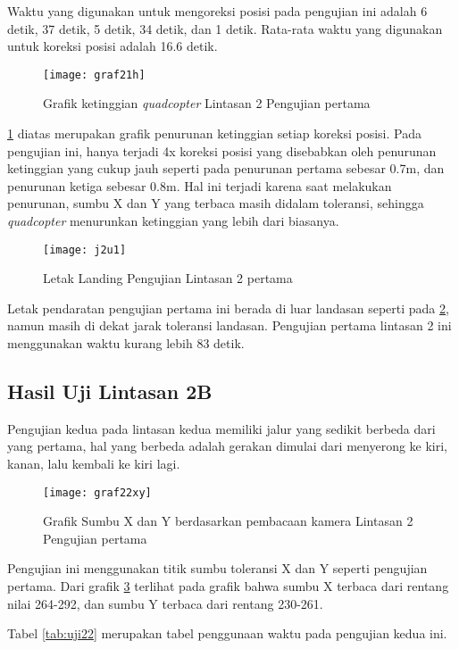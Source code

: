 Waktu yang digunakan untuk mengoreksi posisi pada pengujian ini adalah 6 detik, 37 detik, 5 detik, 34 detik, dan 1 detik. Rata-rata waktu yang digunakan untuk koreksi posisi adalah 16.6 detik.

\begin{figure}[H]
	\centering
	\texttt{[image: graf21h]}
	\caption{Grafik ketinggian \textit{quadcopter} Lintasan 2 Pengujian pertama}
	\label{fig:graf21h}
\end{figure}

\cref{fig:graf21h} diatas merupakan grafik penurunan ketinggian setiap koreksi posisi. Pada pengujian ini, hanya terjadi 4x koreksi posisi yang disebabkan oleh penurunan ketinggian yang cukup jauh seperti pada penurunan pertama sebesar 0.7m, dan penurunan ketiga sebesar 0.8m. Hal ini terjadi karena saat melakukan penurunan, sumbu X dan Y yang terbaca masih didalam toleransi, sehingga \textit{quadcopter} menurunkan ketinggian yang lebih dari biasanya.

\begin{figure}[H]
	\centering
	\texttt{[image: j2u1]}
	\caption{Letak Landing Pengujian Lintasan 2 pertama}
	\label{fig:j2u1}
\end{figure}

Letak pendaratan pengujian pertama ini berada di luar landasan seperti pada \cref{fig:j2u1}, namun masih di dekat jarak toleransi landasan.
Pengujian pertama lintasan 2 ini menggunakan waktu kurang lebih 83 detik.

\subsection{Hasil Uji Lintasan 2B}
Pengujian kedua pada lintasan kedua memiliki jalur yang sedikit berbeda dari yang pertama, hal yang berbeda adalah gerakan dimulai dari menyerong ke kiri, kanan, lalu kembali ke kiri lagi. 

\begin{figure}[H]
	\centering
	\texttt{[image: graf22xy]}
	\caption{Grafik Sumbu X dan Y berdasarkan pembacaan kamera Lintasan 2 Pengujian pertama}
	\label{fig:graf22xy}
\end{figure}

Pengujian ini menggunakan titik sumbu toleransi X dan Y seperti pengujian pertama.
Dari grafik \cref{fig:graf22xy} terlihat pada grafik bahwa sumbu X terbaca dari rentang nilai 264-292, dan sumbu Y terbaca dari rentang 230-261.

Tabel \cref{tab:uji22} merupakan tabel penggunaan waktu pada pengujian kedua ini.

